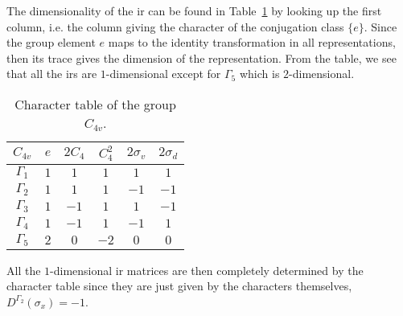 The dimensionality of the \ac{ir} can be found in Table~\ref{tab:Group:Symm:characterTable} by looking up the first column, i.e. the column giving
the character of the conjugation class $\{e\}$.
Since the group element $e$ maps to the identity transformation in all representations, then its
trace gives the dimension of the representation. From the table, we see that all the \ac{ir}s are $1$-dimensional except for
$\Gamma_5$ which is $2$-dimensional.
\begin{table}
    \centering
    \caption{Character table of the group $C_{4v}$.}
    \begin{tabular}{c|ccccc}
        $C_{4v}$ & $e$ & $2C_4$ & $C_4^2$ & $2\sigma_v$ & $2\sigma_d$\\ \hline
        $\Gamma_1$ & $1$ & $1$ & $1$ & $1$ & $1$\\
        $\Gamma_2$ & $1$ & $1$ & $1$ & $-1$ & $-1$\\
        $\Gamma_3$ & $1$ & $-1$ & $1$ & $1$ & $-1$\\
        $\Gamma_4$ & $1$ & $-1$ & $1$ & $-1$ & $1$\\
        $\Gamma_5$ & $2$ & $0$ & $-2$ & $0$ & $0$
    \end{tabular}
    \label{tab:Group:Symm:characterTable}
\end{table}
All the $1$-dimensional \ac{ir} matrices are then completely determined by the character table since they are just given by
the characters themselves, \eg\ $D^{\Gamma_2}(\sigma_x) = -1$.


